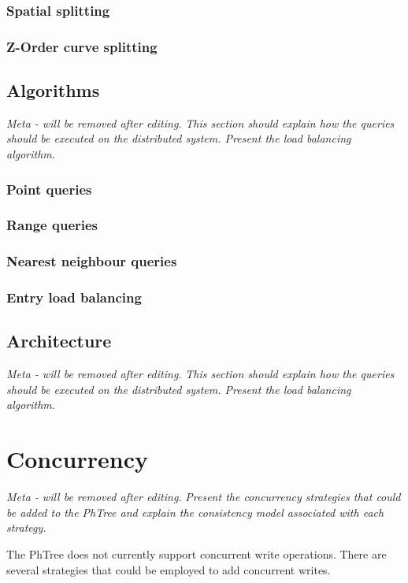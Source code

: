\documentclass[11pt,a4paper]{globis-book}
\begin{document}
\subsection{Spatial splitting}
\subsection{Z-Order curve splitting}

\section{Algorithms}

\textit{Meta - will be removed after editing.}
\textit{This section should explain how the queries should be executed on the distributed system. Present the load balancing algorithm}.
\subsection{Point queries}
\subsection{Range queries}
\subsection{Nearest neighbour queries}
\subsection{Entry load balancing}

\section{Architecture}

\textit{Meta - will be removed after editing.}
\textit{This section should explain how the queries should be executed on the distributed system. Present the load balancing algorithm}.

\chapter{Concurrency}

\textit{Meta - will be removed after editing.}
\textit{Present the concurrency strategies that could be added to the PhTree and explain the consistency model associated with each strategy.}

The PhTree does not currently support concurrent write operations. There are several strategies that could be employed to add concurrent writes.
\end{document}
